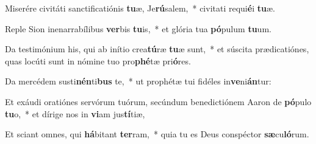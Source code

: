 \item Miserére civitáti sanctificatiónis \textbf{tu}æ, Je\textbf{rú}salem,~* civitati requi\textbf{é}i \textbf{tu}æ.
\item Reple Sion inenarrabílibus \textbf{ver}bis \textbf{tu}is,~* et glória tua \textbf{pó}pulum \textbf{tu}um.
\item Da testimónium his, qui ab inítio crea\textbf{tú}ræ \textbf{tu}æ sunt,~* et súscita prædicatiónes, quas locúti sunt in nómine tuo pro\textbf{phé}tæ pri\textbf{ó}res.
\item Da mercédem susti\textbf{nén}ti\textbf{bus} te,~* ut prophétæ tui fidéles in\textbf{ve}ni\textbf{án}tur:
\item Et exáudi oratiónes servórum tuórum, secúndum benedictiónem Aaron de \textbf{pó}pulo \textbf{tu}o,~* et dírige nos in \textbf{vi}am jus\textbf{tí}tiæ,
\item Et sciant omnes, qui \textbf{há}bitant \textbf{ter}ram,~* quia tu es Deus conspéctor \textbf{sæ}cu\textbf{ló}rum.
